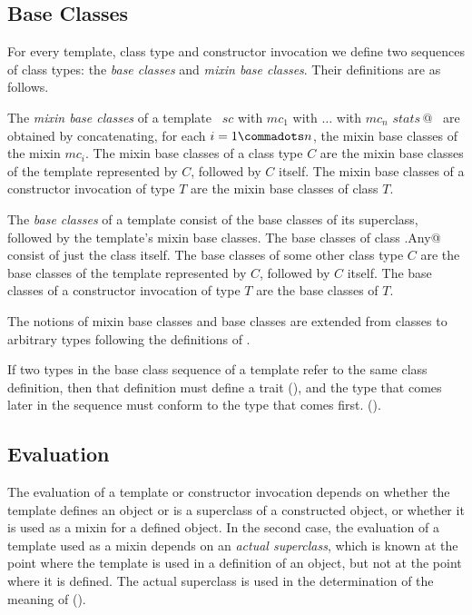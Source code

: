 \documentclass[a4paper,12pt,twoside,titlepage]{book}
\begin{document}
\subsection{Base Classes}
\label{sec:base-classes}

For every template, class type and constructor invocation we define two
sequences of class types: the {\em base classes} and {\em mixin base
classes}. Their definitions are as follows.

The {\em mixin base classes} of a template
~\lstinline@$sc$ with $mc_1$ with $\ldots$ with $mc_n$ {$stats\,$}@~ are obtained by
concatenating, for each $i = 1 \commadots n$, the mixin base classes
of the mixin $mc_i$. The mixin base classes of a class type $C$ are
the mixin base classes of the template represented by $C$, followed by
$C$ itself. The mixin base classes of a constructor invocation of type
$T$ are the mixin base classes of class $T$.

The {\em base classes} of a template consist of the base classes of
its superclass, followed by the template's mixin base classes.  The
base classes of class \lstinline@scala.Any@ consist of just the
class itself. The base classes of some other class type $C$ are the
base classes of the template represented by $C$, followed by $C$
itself.  The base classes of a constructor invocation of type $T$
are the base classes of $T$.

The notions of mixin base classes and base classes are extended from
classes to arbitrary types following the definitions of
.
 
If two types in the base class sequence of a template refer to the
same class definition, then that definition must define a trait
(), and the type that comes later in the sequence must
conform to the type that comes first. 
().

\subsection{Evaluation}

The evaluation of a template or constructor invocation depends on
whether the template defines an object or is a superclass of a
constructed object, or whether it is used as a mixin for a defined
object.  In the second case, the evaluation of a template used as a
mixin depends on an {\em actual superclass}, which is known at the
point where the template is used in a definition of an object, but not
at the point where it is defined. The actual superclass is used in the
determination of the meaning of  ().
\end{document}
